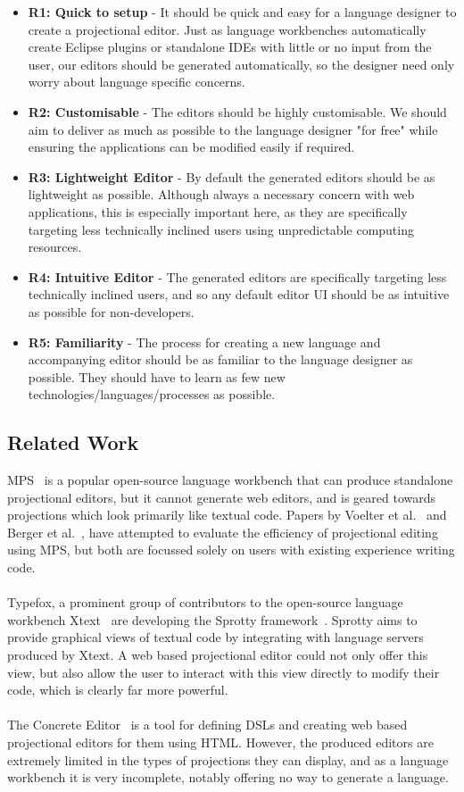 \documentclass{article}
\begin{document}
\begin{itemize}
\item \textbf{R1: Quick to setup} - It should be quick and easy for a language designer to create a projectional editor. Just as language workbenches automatically create Eclipse plugins or standalone IDEs with little or no input from the user, our editors should be generated automatically, so the designer need only worry about language specific concerns.
\item \textbf{R2: Customisable} - The editors should be highly customisable. We should aim to deliver as much as possible to the language designer "for free" while ensuring the applications can be modified easily if required. 
\item \textbf{R3: Lightweight Editor} - By default the generated editors should be as lightweight as possible. Although always a necessary concern with web applications, this is especially important here, as they are specifically targeting less technically inclined users using unpredictable computing resources.
\item \textbf{R4: Intuitive Editor} - The generated editors are specifically targeting less technically inclined users, and so any default editor UI should be as intuitive as possible for non-developers.
\item \textbf{R5: Familiarity} - The process for creating a new language and accompanying editor should be as familiar to the language designer as possible. They should have to learn as few new technologies/languages/processes as possible.
\end{itemize}
\subsection{Related Work}
MPS~\cite{mps} is a popular open-source language workbench that can produce standalone projectional editors, but it cannot generate web editors, and is geared towards projections which look primarily like textual code. Papers by Voelter et al.~\cite{towardsUserFriendlyProjEditors} and Berger et al.~\cite{projEditControlledExperiment}, have attempted to evaluate the efficiency of projectional editing using MPS, but both are focussed solely on users with existing experience writing code.  
\\
\\
Typefox, a prominent group of contributors to the open-source language workbench Xtext~\cite{xtext} are developing the Sprotty framework~\cite{sprotty}. Sprotty aims to provide graphical views of textual code by integrating with language servers produced by Xtext. A web based projectional editor could not only offer this view, but also allow the user to interact with this view directly to modify their code, which is clearly far more powerful.
\\
\\
The Concrete Editor~\cite{concrete} is a tool for defining DSLs and creating web based projectional editors for them using HTML. However, the produced editors are extremely limited in the types of projections they can display, and as a language workbench it is very incomplete, notably offering no way to generate a language.
\end{document}
